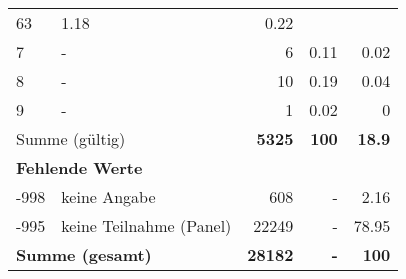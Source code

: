 \begin{longtable}{lXrrr}
       \num{63} &
       \num[round-mode=places,round-precision=2]{1.18} &
         \num[round-mode=places,round-precision=2]{0.22} \\

     7 &
     \multicolumn{1}{X}{ -  } &


       \num{6} &
       \num[round-mode=places,round-precision=2]{0.11} &
         \num[round-mode=places,round-precision=2]{0.02} \\

     8 &
     \multicolumn{1}{X}{ -  } &


       \num{10} &
       \num[round-mode=places,round-precision=2]{0.19} &
         \num[round-mode=places,round-precision=2]{0.04} \\

     9 &
     \multicolumn{1}{X}{ -  } &


       \num{1} &
       \num[round-mode=places,round-precision=2]{0.02} &
         \num[round-mode=places,round-precision=2]{0} \\
     \midrule
     \multicolumn{2}{l}{Summe (gültig)} &
       \textbf{\num{5325}} &
     \textbf{\num{100}} &
       \textbf{\num[round-mode=places,round-precision=2]{18.9}} \\
     \multicolumn{5}{l}{\textbf{Fehlende Werte}}\\
       -998 &
       keine Angabe &
         \num{608} &
        - &
         \num[round-mode=places,round-precision=2]{2.16} \\
       -995 &
       keine Teilnahme (Panel) &
         \num{22249} &
        - &
         \num[round-mode=places,round-precision=2]{78.95} \\
     \midrule
     \multicolumn{2}{l}{\textbf{Summe (gesamt)}} &
          \textbf{\num{28182}} &
        \textbf{-} &
        \textbf{\num{100}} \\
     \bottomrule
     \end{longtable}
     
